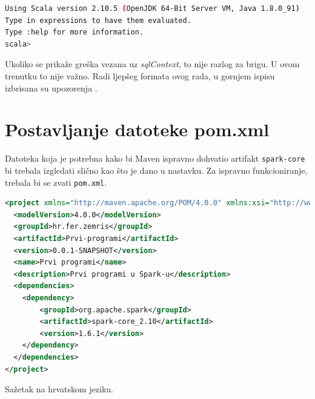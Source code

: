 \documentclass[times, utf8, zavrsni]{fer}
\begin{document}
\begin{appendices}
\begin{lstlisting}[language=bash, size=tiny]
Using Scala version 2.10.5 (OpenJDK 64-Bit Server VM, Java 1.8.0_91)
Type in expressions to have them evaluated.
Type :help for more information.
scala>
\end{lstlisting}


Ukoliko se prikaže greška vezana uz \emph{sqlContext}, to nije razlog za brigu. U ovom trenutku to nije važno. Radi ljepšeg formata ovog rada, u gornjem ispisu izbrisana su upozorenja .
\chapter{Postavljanje datoteke pom.xml}
\label{ch:datotekapomXML}
Datoteka koja je potrebna kako bi Maven ispravno dohvatio artifakt \texttt{spark-core} bi trebala izgledati slično kao što je dano u nastavku. Za ispravno funkcioniranje, trebala bi se zvati \texttt{pom.xml}.
\begin{lstlisting}[language=XML]
<project xmlns="http://maven.apache.org/POM/4.0.0" xmlns:xsi="http://www.w3.org/2001/XMLSchema-instance" xsi:schemaLocation="http://maven.apache.org/POM/4.0.0 http://maven.apache.org/xsd/maven-4.0.0.xsd">
  <modelVersion>4.0.0</modelVersion>
  <groupId>hr.fer.zemris</groupId>
  <artifactId>Prvi-programi</artifactId>
  <version>0.0.1-SNAPSHOT</version>
  <name>Prvi programi</name>
  <description>Prvi programi u Spark-u</description>
  <dependencies>
  	<dependency>
  		<groupId>org.apache.spark</groupId>
  		<artifactId>spark-core_2.10</artifactId>
  		<version>1.6.1</version>
  	</dependency>
  </dependencies>
</project>
\end{lstlisting}
\end{appendices}

\begin{sazetak}
Sažetak na hrvatskom jeziku.

\end{sazetak}

\begin{abstract}
Abstract.

\end{abstract}
\end{document}
